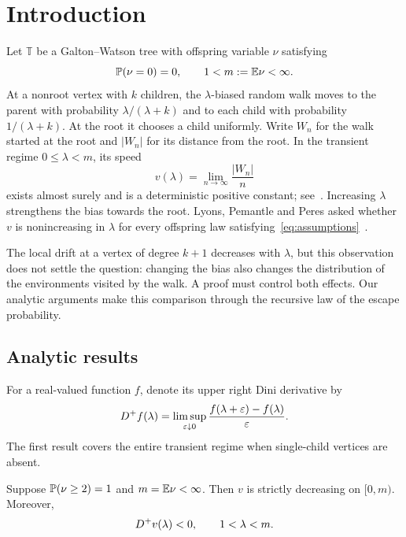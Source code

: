 \section{Introduction}\label{sec:introduction}

Let $\mathbb T$ be a Galton--Watson tree with offspring variable $\nu$ satisfying
\begin{equation}\label{eq:assumptions}
 \mathbb P(\nu=0)=0,\qquad 1<m:=\mathbb E\nu<\infty.
\end{equation}
At a nonroot vertex with $k$ children, the $\lambda$-biased random walk moves to the parent with probability $\lambda/(\lambda+k)$ and to each child with probability $1/(\lambda+k)$. At the root it chooses a child uniformly. Write $W_n$ for the walk started at the root and $|W_n|$ for its distance from the root. In the transient regime $0\le\lambda<m$, its speed
\begin{equation*}
 v(\lambda)=\lim_{n\to\infty}\frac{|W_n|}{n}
\end{equation*}
exists almost surely and is a deterministic positive constant; see~\cite{LPP,Aidekon}. Increasing $\lambda$ strengthens the bias towards the root. Lyons, Pemantle and Peres asked whether $v$ is nonincreasing in $\lambda$ for every offspring law satisfying~\eqref{eq:assumptions}~\cite[Question~2.1]{LPP}.

The local drift at a vertex of degree $k+1$ decreases with $\lambda$, but this observation does not settle the question: changing the bias also changes the distribution of the environments visited by the walk. A proof must control both effects. Our analytic arguments make this comparison through the recursive law of the escape probability.

\subsection{Analytic results}
For a real-valued function $f$, denote its upper right Dini derivative by
\begin{equation*}
 D^{+} f(\lambda)=\limsup_{\varepsilon\downarrow0}
 \frac{f(\lambda+\varepsilon)-f(\lambda)}{\varepsilon}.
\end{equation*}
The first result covers the entire transient regime when single-child vertices are absent.

\begin{theorem}\label{thm:twochildren}
Suppose $\mathbb P(\nu\ge2)=1$ and $m=\mathbb E\nu<\infty$. Then $v$ is strictly decreasing on $[0,m)$. Moreover,
\begin{equation*}
 D^{+} v(\lambda)<0,\qquad 1<\lambda<m.
\end{equation*}
\end{theorem}

